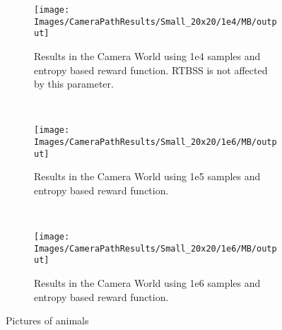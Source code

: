 \begin{figure}[h]
        \centering
        \begin{subfigure}[t]{0.3\textwidth}
                \texttt{[image: Images/CameraPathResults/Small\_20x20/1e4/MB/output]}
                \caption{Results in the Camera World using 1e4 samples and entropy based reward
                function. RTBSS is not affected by this parameter.}
                \label{fig:m4e}
        \end{subfigure}%
        ~ %
        \begin{subfigure}[t]{0.3\textwidth}
                \texttt{[image: Images/CameraPathResults/Small\_20x20/1e6/MB/output]}
                \caption{Results in the Camera World using 1e5 samples and entropy based reward
                function.}
                \label{fig:m5e}
        \end{subfigure}
        ~ %
        \begin{subfigure}[t]{0.3\textwidth}
                \texttt{[image: Images/CameraPathResults/Small\_20x20/1e6/MB/output]}
                \caption{Results in the Camera World using 1e6 samples and entropy based reward
                function.}
                \label{fig:m6e}
        \end{subfigure}
        \caption{Pictures of animals}\label{fig:me}
\end{figure}

